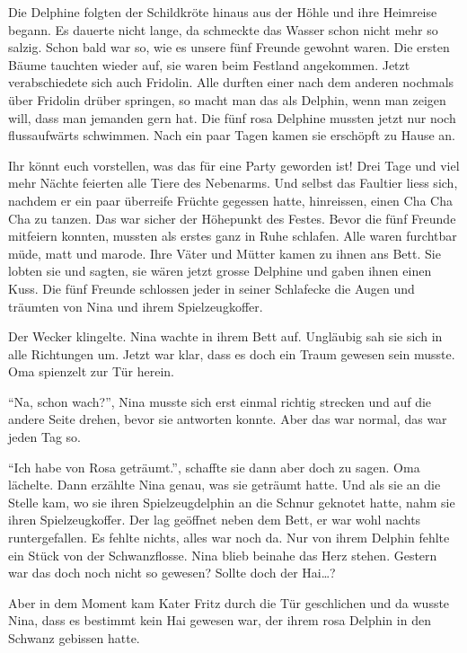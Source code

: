 Die Delphine folgten der Schildkröte hinaus aus der Höhle und ihre Heimreise begann. Es dauerte nicht lange, da schmeckte das Wasser schon nicht mehr so salzig. Schon bald war so, wie es unsere fünf Freunde gewohnt waren. Die ersten Bäume tauchten wieder auf, sie waren beim Festland angekommen. Jetzt verabschiedete sich auch Fridolin. Alle durften einer nach dem anderen nochmals über Fridolin drüber springen, so macht man das als Delphin, wenn man zeigen will, dass man jemanden gern hat. Die fünf rosa Delphine mussten jetzt nur noch flussaufwärts schwimmen. Nach ein paar Tagen kamen sie erschöpft zu Hause an.

Ihr könnt euch vorstellen, was das für eine Party geworden ist! Drei Tage und viel mehr Nächte feierten alle Tiere des Nebenarms. Und selbst das Faultier liess sich, nachdem er ein paar überreife Früchte gegessen hatte, hinreissen, einen Cha Cha Cha zu tanzen. Das war sicher der Höhepunkt des Festes. Bevor die fünf Freunde mitfeiern konnten, mussten als erstes ganz in Ruhe schlafen. Alle waren furchtbar müde, matt und marode. Ihre Väter und Mütter kamen zu ihnen ans Bett. Sie lobten sie und sagten, sie wären jetzt grosse Delphine und gaben ihnen einen Kuss. Die fünf Freunde schlossen jeder in seiner Schlafecke die Augen und träumten von Nina und ihrem Spielzeugkoffer.

\medskip
\begin{mdframed}[style=mystyle]
Der Wecker klingelte. Nina wachte in ihrem Bett auf. Ungläubig sah sie sich in alle Richtungen um. Jetzt war klar, dass es doch ein Traum gewesen sein musste. Oma spienzelt zur Tür herein.

\enquote{Na, schon wach?}, Nina musste sich erst einmal richtig strecken und auf die andere Seite drehen, bevor sie antworten konnte. Aber das war normal, das war jeden Tag so.

\enquote{Ich habe von Rosa geträumt.}, schaffte sie dann aber doch zu sagen. Oma lächelte. Dann erzählte Nina genau, was sie geträumt hatte. Und als sie an die Stelle kam, wo sie ihren Spielzeugdelphin an die Schnur geknotet hatte, nahm sie ihren Spielzeugkoffer. Der lag geöffnet neben dem Bett, er war wohl nachts runtergefallen. Es fehlte nichts, alles war noch da. Nur von ihrem Delphin fehlte ein Stück von der Schwanzflosse. Nina blieb beinahe das Herz stehen. Gestern war das doch noch nicht so gewesen? Sollte doch der Hai\dots?

Aber in dem Moment kam Kater Fritz durch die Tür geschlichen und da wusste Nina, dass es bestimmt kein Hai gewesen war, der ihrem rosa Delphin in den Schwanz gebissen hatte. 
\end{mdframed}\medskip
\vspace{3cm}
\begin{center}
	\Huge\color{red}\FourClowerOpen
\end{center}
